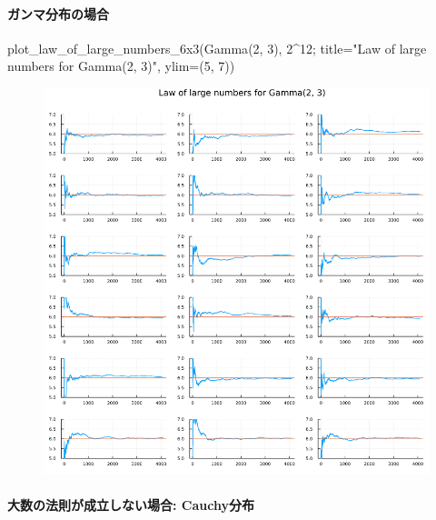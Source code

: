 \documentclass[
  letterpaper,
  DIV=11,
  numbers=noendperiod]{scrartcl}
\let\oldparagraph\paragraph
\renewcommand{\paragraph}[1]{\oldparagraph{#1}\mbox{}}
\newenvironment{Shaded}{\begin{snugshade}}{\end{snugshade}}
\newcommand{\FloatTok}[1]{\textcolor[rgb]{0.68,0.00,0.00}{#1}}
\newcommand{\FunctionTok}[1]{\textcolor[rgb]{0.28,0.35,0.67}{#1}}
\newcommand{\NormalTok}[1]{\textcolor[rgb]{0.00,0.23,0.31}{#1}}
\newcommand{\OperatorTok}[1]{\textcolor[rgb]{0.37,0.37,0.37}{#1}}
\newcommand{\StringTok}[1]{\textcolor[rgb]{0.13,0.47,0.30}{#1}}
\begin{document}
\hypertarget{ux30acux30f3ux30deux5206ux5e03ux306eux5834ux5408}{%
\paragraph{ガンマ分布の場合}\label{ux30acux30f3ux30deux5206ux5e03ux306eux5834ux5408}}

\begin{Shaded}
\begin{Highlighting}[]
\FunctionTok{plot\_law\_of\_large\_numbers\_6x3}\NormalTok{(}\FunctionTok{Gamma}\NormalTok{(}\FloatTok{2}\NormalTok{, }\FloatTok{3}\NormalTok{), }\FloatTok{2}\OperatorTok{\^{}}\FloatTok{12}\NormalTok{;}
\NormalTok{    title}\OperatorTok{=}\StringTok{"Law of large numbers for Gamma(2, 3)"}\NormalTok{, ylim}\OperatorTok{=}\NormalTok{(}\FloatTok{5}\NormalTok{, }\FloatTok{7}\NormalTok{))}
\end{Highlighting}
\end{Shaded}

\begin{figure}[H]

{\centering \includegraphics{05 Central limit theorem_files/figure-pdf/cell-15-output-1.png}

}

\end{figure}

\hypertarget{ux5927ux6570ux306eux6cd5ux5247ux304cux6210ux7acbux3057ux306aux3044ux5834ux5408-cauchyux5206ux5e03}{%
\paragraph{大数の法則が成立しない場合:
Cauchy分布}\label{ux5927ux6570ux306eux6cd5ux5247ux304cux6210ux7acbux3057ux306aux3044ux5834ux5408-cauchyux5206ux5e03}}
\end{document}
